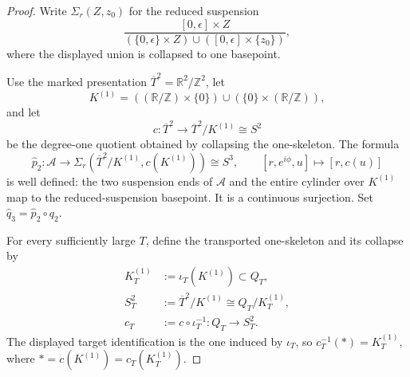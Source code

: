 \begin{proof}
Write \(\Sigma_r(Z,z_0)\) for the reduced suspension
\[
 \frac{[0,\epsilon]\times Z}
 {(\{0,\epsilon\}\times Z)\cup([0,\epsilon]\times\{z_0\})},
\]
where the displayed union is collapsed to one basepoint.

Use the marked presentation
\(\overline T^2=\mathbb R^2/\mathbb Z^2\), let
\[
 K^{(1)}=
 ((\mathbb R/\mathbb Z)\times\{0\})
 \cup(\{0\}\times(\mathbb R/\mathbb Z)),
\]
and let
\[
 c:\overline T^2\longrightarrow
 \overline T^2/K^{(1)}\cong S^2
\]
be the degree-one quotient obtained by collapsing the one-skeleton.  The
formula
\[
 \widehat p_2:\mathcal A\longrightarrow
 \Sigma_r(\overline T^2/K^{(1)},c(K^{(1)}))\cong S^3,
 \qquad
 [r,e^{i\phi},u]\longmapsto[r,c(u)]
\]
is well defined: the two suspension ends of \(\mathcal A\) and the entire
cylinder over \(K^{(1)}\) map to the reduced-suspension basepoint.  It is a
continuous surjection.  Set
\(\widehat q_3=\widehat p_2\circ q_2\).

For every sufficiently large \(T\), define the transported one-skeleton and
its collapse by
\begin{equation}
 \begin{aligned}
 K_T^{(1)}&:=\iota_T(K^{(1)})\subset Q_T,\\
 S_T^2&:=\overline T^2/K^{(1)}\cong Q_T/K_T^{(1)},\\
 c_T&:=c\circ\iota_T^{-1}:Q_T\longrightarrow S_T^2.
 \end{aligned}
 \label{cusp-cone-transported-skeleton-collapse}
\end{equation}
The displayed target identification is the one induced by \(\iota_T\), so
\(c_T^{-1}(*)=K_T^{(1)}\), where
\(*=c(K^{(1)})=c_T(K_T^{(1)})\).


\end{proof}
